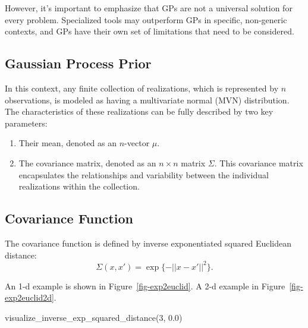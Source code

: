\documentclass[
  letterpaper,
  DIV=11,
  numbers=noendperiod]{scrreprt}
\newenvironment{Shaded}{\begin{snugshade}}{\end{snugshade}}
\newcommand{\DecValTok}[1]{\textcolor[rgb]{0.68,0.00,0.00}{#1}}
\newcommand{\FloatTok}[1]{\textcolor[rgb]{0.68,0.00,0.00}{#1}}
\newcommand{\NormalTok}[1]{\textcolor[rgb]{0.00,0.23,0.31}{#1}}
\providecommand{\tightlist}{%
  \setlength{\itemsep}{0pt}\setlength{\parskip}{0pt}}\usepackage{longtable,booktabs,array}
\begin{document}
However, it's important to emphasize that GPs are not a universal
solution for every problem. Specialized tools may outperform GPs in
specific, non-generic contexts, and GPs have their own set of
limitations that need to be considered.

\hypertarget{gaussian-process-prior}{%
\subsection{Gaussian Process Prior}\label{gaussian-process-prior}}

In this context, any finite collection of realizations, which is
represented by \(n\) observations, is modeled as having a multivariate
normal (MVN) distribution. The characteristics of these realizations can
be fully described by two key parameters:

\begin{enumerate}
\def\labelenumi{\arabic{enumi}.}
\tightlist
\item
  Their mean, denoted as an \(n\)-vector \(\mu\).
\item
  The covariance matrix, denoted as an \(n \times n\) matrix \(\Sigma\).
  This covariance matrix encapsulates the relationships and variability
  between the individual realizations within the collection.
\end{enumerate}

\hypertarget{covariance-function}{%
\subsection{Covariance Function}\label{covariance-function}}

The covariance function is defined by inverse exponentiated squared
Euclidean distance: \[\Sigma(x, x') = \exp\{ - || x - x'||^2 \}.\]

An 1-d example is shown in Figure~\ref{fig-exp2euclid}. A 2-d example in
Figure~\ref{fig-exp2euclid2d}.

\begin{Shaded}
\begin{Highlighting}[]
\NormalTok{visualize\_inverse\_exp\_squared\_distance(}\DecValTok{3}\NormalTok{, }\FloatTok{0.0}\NormalTok{)}
\end{Highlighting}
\end{Shaded}
\end{document}
